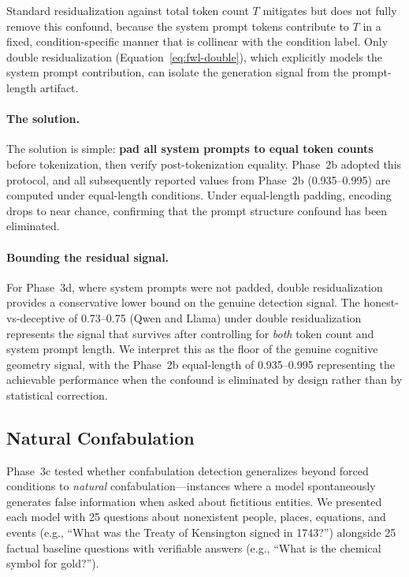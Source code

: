 Standard \fwl residualization against total token count $T$ mitigates but does not fully remove this confound, because the system prompt tokens contribute to $T$ in a fixed, condition-specific manner that is collinear with the condition label.
Only double residualization (Equation~\ref{eq:fwl-double}), which explicitly models the system prompt contribution, can isolate the generation signal from the prompt-length artifact.

\paragraph{The solution.}
The solution is simple: \textbf{pad all system prompts to equal token counts} before tokenization, then verify post-tokenization equality.
Phase~2b adopted this protocol, and all subsequently reported \auroc values from Phase~2b (0.935--0.995) are computed under equal-length conditions.
Under equal-length padding, encoding \auroc drops to near chance, confirming that the prompt structure confound has been eliminated.

\paragraph{Bounding the residual signal.}
For Phase~3d, where system prompts were not padded, double residualization provides a conservative lower bound on the genuine detection signal.
The honest-vs-deceptive \auroc of 0.73--0.75 (Qwen and Llama) under double residualization represents the signal that survives after controlling for \emph{both} token count and system prompt length.
We interpret this as the floor of the genuine cognitive geometry signal, with the Phase~2b equal-length \auroc of 0.935--0.995 representing the achievable performance when the confound is eliminated by design rather than by statistical correction.

\subsection{Natural Confabulation}
\label{sec:natural_confab}

Phase~3c tested whether confabulation detection generalizes beyond forced conditions to \emph{natural} confabulation---instances where a model spontaneously generates false information when asked about fictitious entities.
We presented each model with 25 questions about nonexistent people, places, equations, and events (e.g., ``What was the Treaty of Kensington signed in 1743?'') alongside 25 factual baseline questions with verifiable answers (e.g., ``What is the chemical symbol for gold?'').

